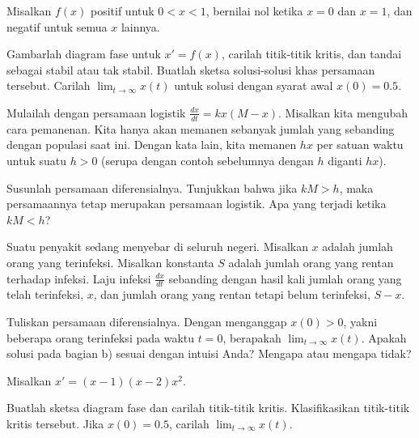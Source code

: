 \begin{exercise}
Misalkan $f(x)$ positif untuk $0 < x < 1$, bernilai nol ketika $x=0$ dan $x=1$,
dan negatif untuk semua $x$ lainnya.
\begin{tasks}
\task Gambarlah diagram fase untuk $x' = f(x)$,
carilah titik-titik kritis, dan tandai sebagai stabil atau tak stabil.
\task Buatlah sketsa solusi-solusi khas persamaan tersebut.
\task Carilah $\displaystyle \lim_{t\to \infty} x(t)$ untuk solusi dengan syarat awal
$x(0) = 0.5$.
\end{tasks}
\end{exercise}

\begin{exercise}
Mulailah dengan persamaan logistik
$\frac{dx}{dt} = kx(M-x)$.
Misalkan kita mengubah cara pemanenan.  Kita hanya akan memanen
sebanyak jumlah yang sebanding dengan populasi saat ini.  Dengan kata lain, kita memanen $hx$
per satuan waktu
untuk suatu $h > 0$ (serupa dengan contoh sebelumnya dengan $h$ diganti $hx$).
\begin{tasks}
\task Susunlah persamaan diferensialnya.
\task Tunjukkan bahwa jika $kM > h$, maka
persamaannya tetap merupakan persamaan logistik.
\task Apa yang terjadi ketika $kM < h$?
\end{tasks}
\end{exercise}

\begin{exercise}
Suatu penyakit sedang menyebar di seluruh negeri.  Misalkan $x$ adalah jumlah orang yang
terinfeksi.  Misalkan konstanta $S$ adalah jumlah orang yang rentan terhadap
infeksi.  Laju infeksi $\frac{dx}{dt}$ sebanding dengan hasil kali
jumlah orang yang telah terinfeksi, $x$, dan jumlah orang yang rentan tetapi
belum terinfeksi, $S-x$.
\begin{tasks}
\task Tuliskan persamaan diferensialnya.
\task Dengan menganggap $x(0) > 0$, yakni beberapa orang terinfeksi pada waktu $t=0$,
berapakah
$\displaystyle \lim_{t\to\infty} x(t)$.
\task Apakah solusi pada bagian b) sesuai dengan intuisi Anda? Mengapa atau mengapa tidak?
\end{tasks}
\end{exercise}


\setcounter{exercise}{100}

\begin{exercise}
\pagebreak[2]
Misalkan $x'=(x-1)(x-2)x^2$.
\begin{tasks}
\task Buatlah sketsa diagram fase dan carilah titik-titik
kritis.
\task Klasifikasikan titik-titik kritis tersebut.
\task Jika $x(0)=0.5$, carilah $\displaystyle \lim_{t\to\infty} x(t)$.
\end{tasks}
\end{exercise}

